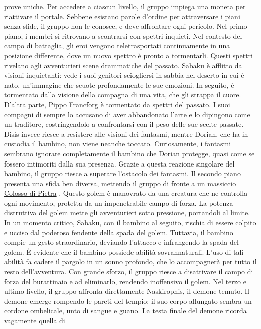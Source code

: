 prove uniche. Per accedere a ciascun livello, il gruppo impiega una
moneta per riattivare il portale. Sebbene esistano parole d'ordine per
attraversare i piani senza sfide, il gruppo non le conosce, e deve
affrontare ogni pericolo. Nel primo piano, i membri si ritrovano a
scontrarsi con spettri inquieti. Nel contesto del campo di battaglia,
gli eroi vengono teletrasportati continuamente in una posizione
differente, dove un nuovo spettro è pronto a tormentarli. Questi spettri
rivelano agli avventurieri scene drammatiche del passato. Sabaku è
afflitto da visioni inquietanti: vede i suoi genitori sciogliersi in
sabbia nel deserto in cui è nato, un'immagine che scuote profondamente
le sue emozioni. In seguito, è tormentato dalla visione della compagna
di una vita, che gli strappa il cuore. D'altra parte, Pippo Francforg è
tormentato da spettri del passato. I suoi compagni di sempre lo accusano
di aver abbandonato l'arte e lo dipingono come un traditore,
costringendolo a confrontarsi con il peso delle sue scelte passate.
Disis invece riesce a resistere alle visioni dei fantasmi, mentre
Dorian, che ha in custodia il bambino, non viene neanche toccato.
Curiosamente, i fantasmi sembrano ignorare completamente il bambino che
Dorian protegge, quasi come se fossero intimoriti dalla sua presenza.
Grazie a questa reazione singolare del bambino, il gruppo riesce a
superare l'ostacolo dei fantasmi. Il secondo piano presenta una sfida
ben diversa, mettendo il gruppo di fronte a un massiccio
\href{Colosso\%20di\%20Pietra\%20e86bfcf7509c43f68ad91526717e23b0.md}{Colosso
di Pietra} . Questo golem è manovrato da una creatura che ne controlla
ogni movimento, protetta da un impenetrabile campo di forza. La potenza
distruttiva del golem mette gli avventurieri sotto pressione, portandoli
al limite. In un momento critico, Sabaku, con il bambino al seguito,
rischia di essere colpito e ucciso dal poderoso fendente della spada del
golem. Tuttavia, il bambino compie un gesto straordinario, deviando
l'attacco e infrangendo la spada del golem. È evidente che il bambino
possiede abilità sovrannaturali. L'uso di tali abilità fa cadere il
pargolo in un sonno profondo, che lo accompagnerà per tutto il resto
dell'avventura. Con grande sforzo, il gruppo riesce a disattivare il
campo di forza del burattinaio e ad eliminarlo, rendendo inoffensivo il
golem. Nel terzo e ultimo livello, il gruppo affronta direttamente
Naskirophis, il demone temuto. Il demone emerge rompendo le pareti del
tempio: il suo corpo allungato sembra un cordone ombelicale, unto di
sangue e guano. La testa finale del demone ricorda vagamente quella di
